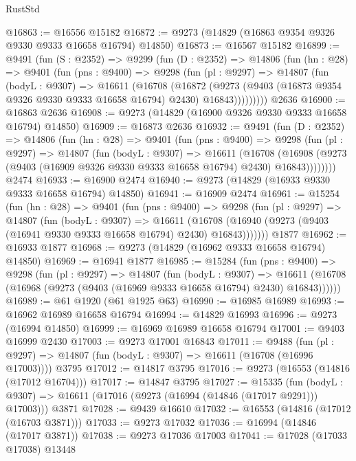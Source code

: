 \begin{lexlean}{RustStd}
\begin{coremodule}
@16863 := @16556 @15182
@16872 := @9273 (@14829 (@16863 @9354 @9326 @9330 @9333 @16658 @16794) @14850)
@16873 := @16567 @15182
@16899 := @9491
    (fun (S : @2352) =>
    @9299
      (fun (D : @2352) =>
      @14806
        (fun (hn : @28) =>
        @9401
          (fun (pns : @9400) =>
          @9298
            (fun (pl : @9297) =>
            @14807
              (fun (bodyL : @9307) =>
              @16611
                (@16708
                  (@16872
                    (@9273
                      (@9403 (@16873 @9354 @9326 @9330 @9333 @16658 @16794) @2430)
                      @16843)))))))))
    @2636
@16900 := @16863 @2636
@16908 := @9273 (@14829 (@16900 @9326 @9330 @9333 @16658 @16794) @14850)
@16909 := @16873 @2636
@16932 := @9491
    (fun (D : @2352) =>
    @14806
      (fun (hn : @28) =>
      @9401
        (fun (pns : @9400) =>
        @9298
          (fun (pl : @9297) =>
          @14807
            (fun (bodyL : @9307) =>
            @16611
              (@16708
                (@16908 (@9273 (@9403 (@16909 @9326 @9330 @9333 @16658 @16794) @2430) @16843))))))))
    @2474
@16933 := @16900 @2474
@16940 := @9273 (@14829 (@16933 @9330 @9333 @16658 @16794) @14850)
@16941 := @16909 @2474
@16961 := @15254
    (fun (hn : @28) =>
    @9401
      (fun (pns : @9400) =>
      @9298
        (fun (pl : @9297) =>
        @14807
          (fun (bodyL : @9307) =>
          @16611
            (@16708 (@16940 (@9273 (@9403 (@16941 @9330 @9333 @16658 @16794) @2430) @16843)))))))
    @1877
@16962 := @16933 @1877
@16968 := @9273 (@14829 (@16962 @9333 @16658 @16794) @14850)
@16969 := @16941 @1877
@16985 := @15284
    (fun (pns : @9400) =>
    @9298
      (fun (pl : @9297) =>
      @14807
        (fun (bodyL : @9307) =>
        @16611 (@16708 (@16968 (@9273 (@9403 (@16969 @9333 @16658 @16794) @2430) @16843))))))
@16989 := @61 @1920 (@61 @1925 @63)
@16990 := @16985 @16989
@16993 := @16962 @16989 @16658 @16794
@16994 := @14829 @16993
@16996 := @9273 (@16994 @14850)
@16999 := @16969 @16989 @16658 @16794
@17001 := @9403 @16999 @2430
@17003 := @9273 @17001 @16843
@17011 := @9488
    (fun (pl : @9297) => @14807 (fun (bodyL : @9307) => @16611 (@16708 (@16996 @17003))))
    @3795
@17012 := @14817 @3795
@17016 := @9273 (@16553 (@14816 (@17012 @16704)))
@17017 := @14847 @3795
@17027 := @15335
    (fun (bodyL : @9307) => @16611 (@17016 (@9273 (@16994 (@14846 (@17017 @9291))) @17003)))
    @3871
@17028 := @9439 @16610
@17032 := @16553 (@14816 (@17012 (@16703 @3871)))
@17033 := @9273 @17032
@17036 := @16994 (@14846 (@17017 @3871))
@17038 := @9273 @17036 @17003
@17041 := @17028 (@17033 @17038) @13448

\end{coremodule}
\end{lexlean}
